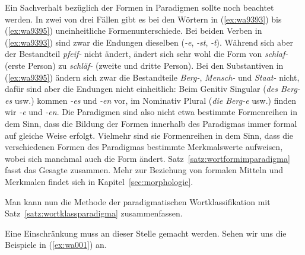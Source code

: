 Ein Sachverhalt bezüglich der Formen in Paradigmen sollte noch beachtet werden.
In zwei von drei Fällen gibt es bei den Wörtern in (\ref{ex:wa9393}) bis (\ref{ex:wa9395}) uneinheitliche Formenunterschiede.
Bei beiden Verben in (\ref{ex:wa9393}) sind zwar die Endungen dieselben (\textit{-e}, \textit{-st}, \textit{-t}).
Während sich aber der Bestandteil \textit{pfeif-} nicht ändert, ändert sich sehr wohl die Form von \textit{schlaf-} (erste Person) zu \textit{schläf-} (zweite und dritte Person).
Bei den Substantiven in (\ref{ex:wa9395}) ändern sich zwar die Bestandteile \textit{Berg-}, \textit{Mensch-} und \textit{Staat-} nicht, dafür sind aber die Endungen nicht einheitlich:
Beim Genitiv Singular (\textit{des Berg-es} usw.) kommen \textit{-es} und \textit{-en} vor, im Nominativ Plural (\textit{die Berg-e} usw.) finden wir \textit{-e} und \textit{-en}.
Die Paradigmen sind also nicht etwa bestimmte Formenreihen in dem Sinn, dass die Bildung der Formen innerhalb des Paradigmas immer formal auf gleiche Weise erfolgt.
Vielmehr sind sie Formenreihen in dem Sinn, dass die verschiedenen Formen des Paradigmas bestimmte Merkmalswerte aufweisen, wobei sich manchmal auch die Form ändert.
Satz~\ref{satz:wortformimparadigma} fasst das Gesagte zusammen.
Mehr zur Beziehung von formalen Mitteln und Merkmalen findet sich in Kapitel~\ref{sec:morphologie}.


Man kann nun die Methode der paradigmatischen Wortklassifikation mit Satz~\ref{satz:wortklassparadigma} zusammenfassen.



Eine Einschränkung muss an dieser Stelle gemacht werden.
Sehen wir uns die Beispiele in (\ref{ex:wa001}) an.

\begin{exe}
  \ex\label{ex:wa001}\begin{xlist}
  \end{xlist}
\end{exe}


